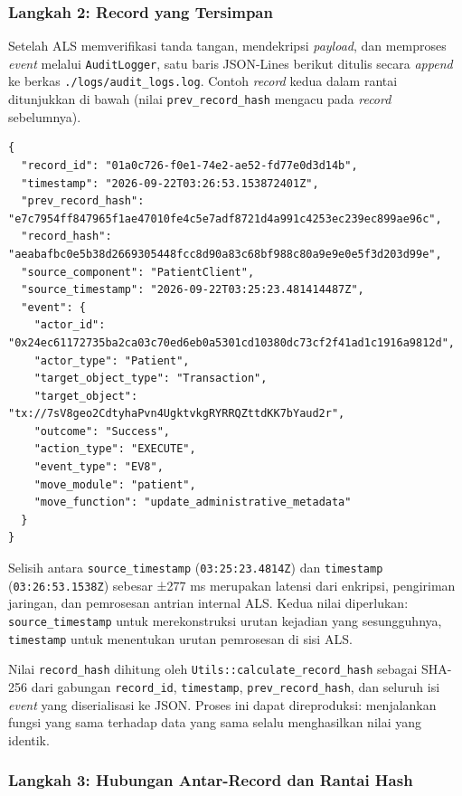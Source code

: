 \subsubsection{Langkah 2: Record yang Tersimpan}
 
Setelah ALS memverifikasi tanda tangan, mendekripsi \textit{payload}, dan
memproses \textit{event} melalui \texttt{AuditLogger}, satu baris JSON-Lines
berikut ditulis secara \textit{append} ke berkas \texttt{./logs/audit\_logs.log}.
Contoh \textit{record} kedua dalam rantai ditunjukkan di bawah (nilai
\texttt{prev\_record\_hash} mengacu pada \textit{record} sebelumnya).
 
\begin{verbatim}
{
  "record_id": "01a0c726-f0e1-74e2-ae52-fd77e0d3d14b",
  "timestamp": "2026-09-22T03:26:53.153872401Z",
  "prev_record_hash": "e7c7954ff847965f1ae47010fe4c5e7adf8721d4a991c4253ec239ec899ae96c",
  "record_hash": "aeabafbc0e5b38d2669305448fcc8d90a83c68bf988c80a9e9e0e5f3d203d99e",
  "source_component": "PatientClient",
  "source_timestamp": "2026-09-22T03:25:23.481414487Z",
  "event": {
    "actor_id": "0x24ec61172735ba2ca03c70ed6eb0a5301cd10380dc73cf2f41ad1c1916a9812d",
    "actor_type": "Patient",
    "target_object_type": "Transaction",
    "target_object": "tx://7sV8geo2CdtyhaPvn4UgktvkgRYRRQZttdKK7bYaud2r",
    "outcome": "Success",
    "action_type": "EXECUTE",
    "event_type": "EV8",
    "move_module": "patient",
    "move_function": "update_administrative_metadata"
  }
}
\end{verbatim}
 
Selisih antara \texttt{source\_timestamp} (\texttt{03:25:23.4814Z}) dan
\texttt{timestamp} (\texttt{03:26:53.1538Z}) sebesar ±277 ms merupakan latensi
dari enkripsi, pengiriman jaringan, dan pemrosesan antrian internal ALS.
Kedua nilai diperlukan: \texttt{source\_timestamp} untuk merekonstruksi urutan
kejadian yang sesungguhnya, \texttt{timestamp} untuk menentukan urutan
pemrosesan di sisi ALS.
 
Nilai \texttt{record\_hash} dihitung oleh \texttt{Utils::calculate\_record\_hash}
sebagai SHA-256 dari gabungan \texttt{record\_id}, \texttt{timestamp},
\texttt{prev\_record\_hash}, dan seluruh isi \textit{event} yang diserialisasi
ke JSON. Proses ini dapat direproduksi: menjalankan fungsi yang sama terhadap
data yang sama selalu menghasilkan nilai yang identik.
 
\subsubsection{Langkah 3: Hubungan Antar-Record dan Rantai Hash}
 

